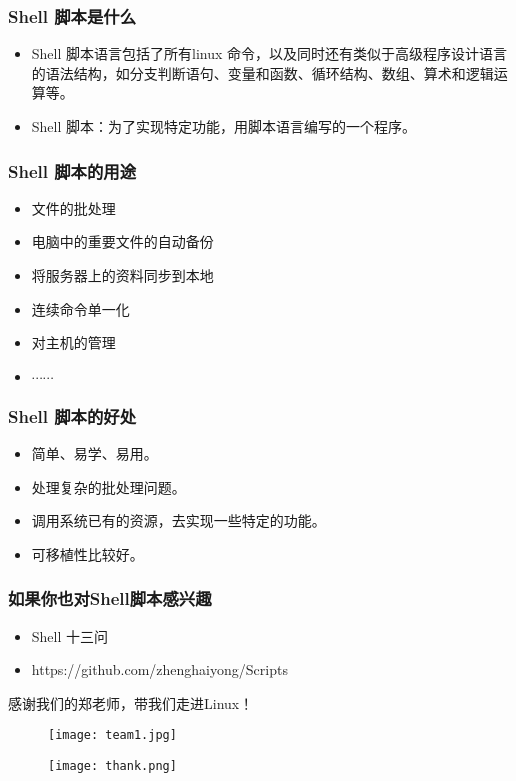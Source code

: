 \documentclass[notheorems,mathserif,table,compress,10pt]{beamer}  %
\begin{document}
\begin{frame}
\frametitle{Shell 脚本是什么}
 \begin{itemize}
 \item Shell 脚本语言包括了所有linux 命令，以及同时还有类似于高级程序设计语言的语法结构，如分支判断语句、变量和函数、循环结构、数组、算术和逻辑运算等。
  \item  Shell 脚本：为了实现特定功能，用脚本语言编写的一个程序。

\end{itemize}
\end{frame}



\begin{frame}
\frametitle{Shell 脚本的用途}
 \begin{itemize}
 \item 文件的批处理
\item  电脑中的重要文件的自动备份 
\item  将服务器上的资料同步到本地
\item   连续命令单一化
\item   对主机的管理
\item  $\cdots\cdots$ 
\end{itemize}
\end{frame}

\begin{frame}
\frametitle{Shell 脚本的好处}
 \begin{itemize}
  \item 简单、易学、易用。
 \item 处理复杂的批处理问题。
 \item 调用系统已有的资源，去实现一些特定的功能。
 \item 可移植性比较好。
 \end{itemize}
\end{frame}

\begin{frame}
\frametitle{如果你也对Shell脚本感兴趣}
 \begin{itemize}
  \item Shell 十三问
 \item https://github.com/zhenghaiyong/Scripts

\end{itemize}
\end{frame}

\begin{frame}
\begin{tcolorbox}[colback=blue!5,colframe=blue!75!black]
感谢我们的郑老师，带我们走进Linux！
\end{tcolorbox}
\begin{figure}\centering 
  \begin{minipage}[t]{0.7\linewidth} 
    
    \texttt{[image: team1.jpg]}
  \end{minipage}
\end{figure} 
\end{frame}



\begin{frame}

\begin{figure}\centering 
  \begin{minipage}[t]{0.7\linewidth} 
    
    \texttt{[image: thank.png]}
  \end{minipage}
\end{figure} 
\end{frame}
\end{document}
